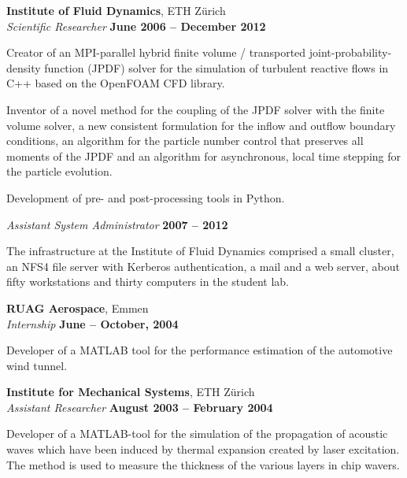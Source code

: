 \documentclass[line,11pt,a4paper]{../resume}
\begin{document}
\begin{resume}
\textbf{Institute of Fluid Dynamics}, ETH Z\"urich \vspace{2mm}\\\vspace{1mm}%
\textsl{Scientific Researcher} \hfill \textbf{June 2006 -- December 2012}\\
\begin{list2}
  \item Creator of an MPI-parallel hybrid finite volume / transported
    joint-probability-density function (JPDF) solver for the simulation of
    turbulent reactive flows in C++ based on the OpenFOAM CFD library.

  \item Inventor of a novel method for the coupling of the JPDF solver with the
    finite volume solver, a new consistent formulation for the inflow and
    outflow boundary conditions, an algorithm for the particle number control
    that preserves all moments of the JPDF and an algorithm for asynchronous,
    local time stepping for the particle evolution.

  \item Development of pre- and post-processing tools in Python.
\end{list2}

\textsl{Assistant System Administrator} \hfill \textbf{2007 -- 2012}\\
\begin{list2}
  \item The infrastructure at the Institute of Fluid Dynamics comprised a small
    cluster, an NFS4 file server with Kerberos authentication, a mail and a web
    server, about fifty workstations and thirty computers in the student lab.
\end{list2}

\textbf{RUAG Aerospace}, Emmen \vspace{2mm}\\\vspace{1mm}%
\textsl{Internship} \hfill \textbf{June -- October, 2004}\\
\begin{list2}
  \item Developer of a MATLAB tool for the performance estimation of the
    automotive wind tunnel.
\end{list2}

\textbf{Institute for Mechanical Systems}, ETH Z\"urich \vspace{2mm}\\\vspace{1mm}%
\textsl{Assistant Researcher} \hfill \textbf{August 2003 -- February 2004}\\
\begin{list2}
  \item Developer of a MATLAB-tool for the simulation of the propagation of
    acoustic waves which have been induced by thermal expansion created by
    laser excitation. The method is used to measure the thickness of the
    various layers in chip wavers.
\end{list2}


\end{resume}
\end{document}
